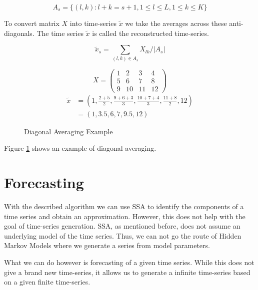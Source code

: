\begin{equation}
A_{s}=\{(l, k): l+k=s+1,1 \leq l \leq L, 1 \leq k \leq K\}
\end{equation}

To convert matrix $X$ into time-series $\tilde{x}$ we take the averages across these anti-diagonals. The time series $\tilde{x}$ is called the reconstructed time-series. 

\begin{equation}
    \widetilde{x}_{s}=\sum_{(l, k) \in A_{s}} X_{l k} /\left|A_{s}\right|
\end{equation}


\begin{figure}
   \begin{equation*}
      X = 
      \begin{pmatrix}
         1 & 2 & 3 & 4 \\
         5 & 6 & 7 & 8 \\
         9 & 10 & 11 & 12
      \end{pmatrix}
   \end{equation*}
   \begin{equation*}
      \begin{aligned}
      \widetilde{x} &= (1, \frac{2+5}{2}, \frac{9 + 6 + 3}{3}, \frac{10 + 7 + 4}{3}, \frac{11 + 8}{2}, 12) \\
      &= (1, 3.5, 6, 7, 9.5, 12)
      \end{aligned}
   \end{equation*}
\caption{Diagonal Averaging Example}
\label{fig:diagonal-averaging}
\end{figure}

Figure \ref{fig:diagonal-averaging} shows an example of diagonal averaging. 

\section{Forecasting}

With the described algorithm we can use SSA to identify the components of a time series and obtain an approximation. However, this does not help with the goal of time-series generation. SSA, as mentioned before, does not assume an underlying model of the time series. Thus, we can not go the route of Hidden Markov Models where we generate a series from model parameters. 

What we can do however is forecasting of a given time series. While this does not give a brand new time-series, it allows us to generate a infinite time-series based on a given finite time-series.

